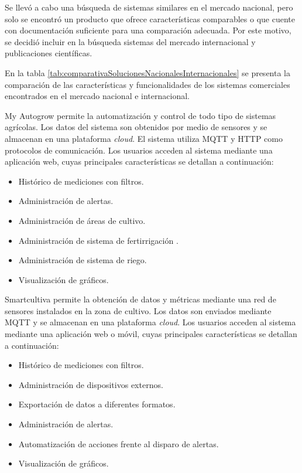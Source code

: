 Se llevó a cabo una búsqueda de sistemas similares en el mercado nacional, pero solo se encontró un producto que ofrece características comparables o que cuente con documentación suficiente para una comparación adecuada. Por este motivo, se decidió incluir en la búsqueda sistemas del mercado internacional y publicaciones científicas. 

En la tabla \ref{tab:comparativaSolucionesNacionalesInternacionales} se presenta la comparación de las características y funcionalidades de los sistemas comerciales encontrados en el mercado nacional e internacional.

My Autogrow \citep{WEBSITE:MYAUTOGROW} permite la automatización y control de todo tipo de sistemas agrícolas. Los datos del sistema son obtenidos por medio de sensores y se almacenan en una plataforma \emph{cloud}. El sistema utiliza MQTT y HTTP como protocolos de comunicación. Los usuarios acceden al sistema mediante una aplicación web, cuyas principales características se detallan a continuación: 

\begin{itemize}
	\item Histórico de mediciones con filtros.
	\item Administración de alertas.
	\item Administración de áreas de cultivo.
	\item Administración de sistema de fertirrigación \citep{WEBSITE:FERTIRRIGACION}.
	\item Administración de sistema de riego.
	\item Visualización de gráficos.
\end{itemize}

Smartcultiva \citep{WEBSITE:PLIOT} permite la obtención de datos y métricas mediante una red de sensores instalados en la zona de cultivo. Los datos son enviados mediante MQTT y se almacenan en una plataforma \emph{cloud}. Los usuarios acceden al sistema mediante una aplicación web o móvil, cuyas principales características se detallan a continuación: 

\begin{itemize}
	\item Histórico de mediciones con filtros.
	\item Administración de dispositivos externos.
	\item Exportación de datos a diferentes formatos.
	\item Administración de alertas.
	\item Automatización de acciones frente al disparo de alertas.
	\item Visualización de gráficos.
\end{itemize}

